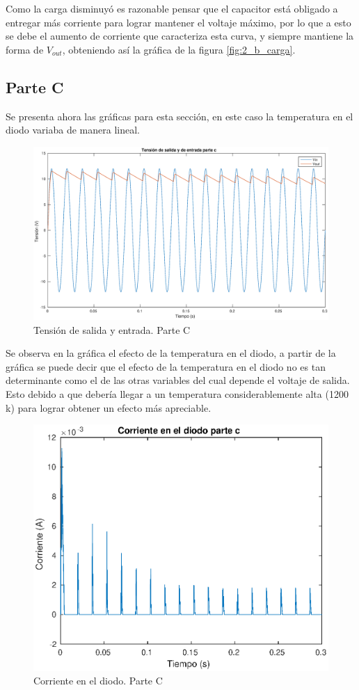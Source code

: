 \documentclass[12pt,letterpaper]{article}
\begin{document}
Como la carga disminuyó es razonable pensar que el capacitor está obligado a entregar más corriente para lograr mantener el voltaje máximo, por lo que a esto se debe el aumento de corriente que caracteriza esta curva, y siempre mantiene la forma de $V_{out}$, obteniendo así la gráfica de la figura \ref{fig:2_b_carga}.


\subsection{Parte C}

Se presenta ahora las gráficas para esta sección, en este caso la temperatura en el diodo variaba de manera lineal.

\begin{figure}[ht!]
  \centering
  \includegraphics[width=1.0\linewidth]{pictures/Ejercicio2_c_Vin_Vout.eps}
  \caption{Tensión de salida y entrada. Parte C}
  \label{fig:2_c_Vin_Vout}
\end{figure}

Se observa en la gráfica el efecto de la temperatura en el diodo, a partir de la gráfica se puede decir que el efecto de la temperatura en el diodo no es tan determinante como el de las otras variables del cual depende el voltaje de salida. Esto debido a que debería llegar a un temperatura considerablemente alta (1200 k) para lograr obtener un efecto más apreciable.

\begin{figure}[ht!]
  \centering
  \includegraphics[width=0.8\linewidth]{pictures/Ejercicio2_c_corriente_diodo.eps}
  \caption{Corriente en el diodo. Parte C}
  \label{fig:2_c_Id}
\end{figure}
\end{document}
